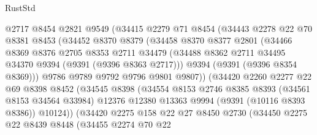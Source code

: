 \begin{lexlean}{RustStd}
\begin{coremodule}
                    @2717
                    @8454
                    @2821
                    @9549
                    (@34415
                      @2279
                      @71
                      @8454
                      (@34443
                        @2278
                        @22
                        @70
                        @8381
                        @8453
                        (@34452
                          @8370
                          @8379
                          (@34458
                            @8370
                            @8377
                            @2801
                            (@34466
                              @8369
                              @8376
                              @2705
                              @8353
                              @2711
                              @34479
                              (@34488 @8362 @2711 @34495 @34370 @9394 (@9391 (@9396 @8363 @2717)))
                              @9394
                              (@9391 (@9396 @8354 @8369)))
                            @9786
                            @9789
                            @9792
                            @9796
                            @9801
                            @9807))
                        (@34420
                          @2260
                          @2277
                          @22
                          @69
                          @8398
                          @8452
                          (@34545
                            @8398
                            (@34554
                              @8153
                              @2746
                              @8385
                              @8393
                              (@34561 @8153 @34564 @33984)
                              @12376
                              @12380
                              @13363
                              @9994
                              (@9391 (@10116 @8393 @8386))
                              @10124))
                          (@34420
                            @2275
                            @158
                            @22
                            @27
                            @8450
                            @2730
                            (@34450
                              @2275
                              @22
                              @8439
                              @8448
                              (@34455
                                @2274
                                @70
                                @22

\end{coremodule}
\end{lexlean}
